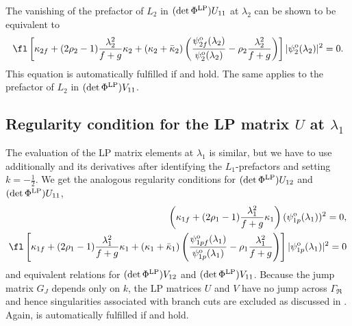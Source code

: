 \documentclass[12pt]{iopart}
\begin{document}
The vanishing of the prefactor of $L_2$ in $(\det \Phi^{\rm LP}) U_{11}$ at $\lambda_2$ can be shown to be equivalent to
\begin{eqnarray} \label{U22GL}
\fl\left[\kappa_{2f}+(2\rho_2-1)\frac{\lambda_2^2}{f+g}\kappa_2+(\kappa_2+\bar{\kappa}_2)\left(\frac{\psi_{2f}^{\rm o}(\lambda_2)}{\psi_{2}^{\rm o}(\lambda_2)}-\rho_2\frac{\lambda_2^2}{f+g}\right)\right]|\psi_2^{\rm o}(\lambda_2)|^2=0.
\end{eqnarray}
This equation is automatically fulfilled if  and  hold. The same applies to the prefactor of $L_2$ in $(\det \Phi^{\rm LP}) V_{11}$.

\subsection{Regularity condition for the LP matrix $U$ at $\lambda_1$}

The evaluation of the LP matrix elements at $\lambda_1$ is similar, but we have to use additionally  and its derivatives after identifying the $L_1$-prefactors and setting $k=-\frac12$. We get the analogous regularity conditions
for $(\det \Phi^{\rm LP}) U_{12}$ and $(\det \Phi^{\rm LP}) U_{11}$,
\begin{eqnarray}
\left(\kappa_{1f}+(2\rho_1-1)\frac{\lambda_1^2}{f+g}\kappa_1\right)(\psi_{1p}^{\rm o}(\lambda_1))^2=0, \label{kappa1DGL}\\ 
\fl\left[\kappa_{1f}+(2\rho_1-1)\frac{\lambda_1^2}{f+g}\kappa_1+(\kappa_1+\bar{\kappa}_1)\left(\frac{\psi_{1pf}^{\rm o}(\lambda_1)}{\psi_{1p}^{\rm o}(\lambda_1)}-\rho_1\frac{\lambda_1^2}{f+g}\right)\right]|\psi_{1p}^{\rm o}(\lambda_1)|^2=0 \label{U22GL2}
\end{eqnarray}
and equivalent relations for $(\det \Phi^{\rm LP}) V_{12}$ and $(\det \Phi^{\rm LP}) V_{11}$. Because the jump matrix $G_J$ depends only on $k$, the LP matrices $U$ and $V$ have no jump across $\Gamma_\Re$ and hence singularities associated with branch cuts are excluded as discussed in . Again,  is automatically fulfilled if  and  hold. 
\end{document}
